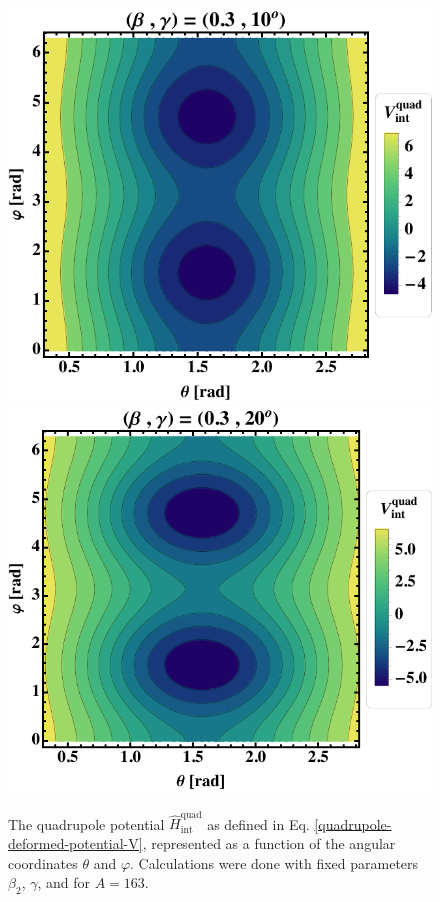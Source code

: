 \begin{figure}
    \centering
    \includegraphics[scale=0.66]{Chapters/Figures/quadrupole-potentialV-1.pdf}
    \includegraphics[scale=0.66]{Chapters/Figures/quadrupole-potentialV-2.pdf}
    \caption{The quadrupole potential $\hat{H}_\text{int}^\text{quad}$ as defined in Eq. \ref{quadrupole-deformed-potential-V}, represented as a function of the angular coordinates $\theta$ and $\varphi$. Calculations were done with fixed parameters $\beta_2$, $\gamma$, and for $A=163$.}
    \label{figs-deformed-quadrupole-potential-1}
\end{figure}
